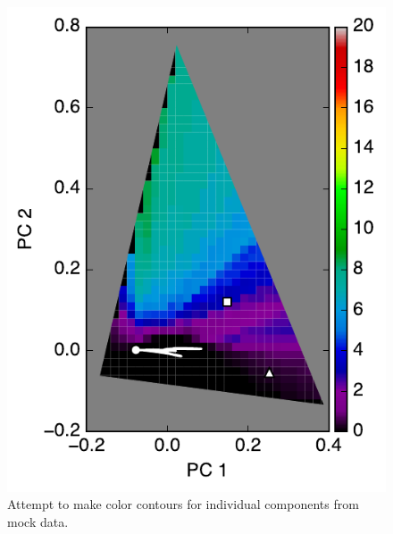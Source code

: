 \documentclass[iop,numberedappendix,apj]{emulateapj}
\begin{document}
\begin{figure}[tbh!]
\begin{minipage}{0.33\hsize}
\begin{center}
	\includegraphics[width=\hsize]{mockdata_90deg_3types_t360_lc_noreg_2.pdf}
    \end{center}	
   \end{minipage}    
   \caption{Attempt to make color contours for individual components from mock data. }
\label{fig:EPOXI_individual}
\end{figure}
\end{document}
